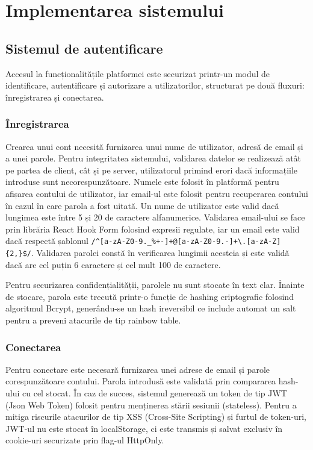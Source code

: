 \chapter{Implementarea sistemului}

\section{Sistemul de autentificare}

Accesul la funcționalitățile platformei este securizat printr-un modul de identificare, autentificare și autorizare a utilizatorilor, structurat pe două fluxuri: înregistrarea și conectarea.

\subsection{Înregistrarea}

Crearea unui cont necesită furnizarea unui nume de utilizator, adresă de email și a unei parole. Pentru integritatea sistemului, validarea datelor se realizează atât pe partea de client, cât și pe server, utilizatorul primind erori dacă informațiile introduse sunt necorespunzătoare. Numele este folosit în platformă pentru afișarea contului de utilizator, iar email-ul este folosit pentru recuperarea contului în cazul în care parola a fost uitată. Un nume de utilizator este valid dacă lungimea este între 5 și 20 de caractere alfanumerice. Validarea email-ului se face prin librăria React Hook Form folosind expresii regulate, iar un email este valid dacă respectă șablonul \verb|/^[a-zA-Z0-9._%+-]+@[a-zA-Z0-9.-]+\.[a-zA-Z]{2,}$/|. Validarea parolei constă în verificarea lungimii acesteia și este validă dacă are cel puțin 6 caractere și cel mult 100 de caractere. 

Pentru securizarea confidențialității, parolele nu sunt stocate în text clar. Înainte de stocare, parola este trecută printr-o funcție de hashing criptografic folosind algoritmul Bcrypt, generându-se un hash ireversibil ce include automat un salt pentru a preveni atacurile de tip rainbow table.

\subsection{Conectarea}

Pentru conectare este necesară furnizarea unei adrese de email și parole corespunzătoare contului. Parola introdusă este validată prin compararea hash-ului cu cel stocat. În caz de succes, sistemul generează un token de tip JWT (Json Web Token) folosit pentru menținerea stării sesiunii (stateless). Pentru a mitiga riscurile atacurilor de tip XSS (Cross-Site Scripting) și furtul de token-uri, JWT-ul nu este stocat în localStorage, ci este transmis și salvat exclusiv în cookie-uri securizate prin flag-ul HttpOnly. 

